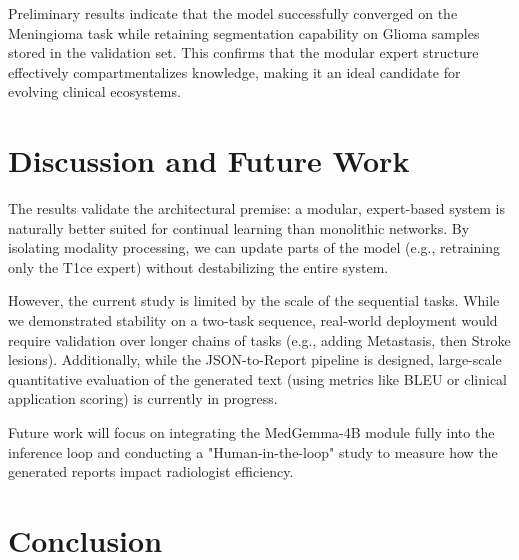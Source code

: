 \documentclass[conference]{IEEEtran}
\begin{document}
Preliminary results indicate that the model successfully converged on the Meningioma task while retaining segmentation capability on Glioma samples stored in the validation set. This confirms that the modular expert structure effectively compartmentalizes knowledge, making it an ideal candidate for evolving clinical ecosystems.


\section{Discussion and Future Work}

The results validate the architectural premise: a modular, expert-based system is naturally better suited for continual learning than monolithic networks. By isolating modality processing, we can update parts of the model (e.g., retraining only the T1ce expert) without destabilizing the entire system.

However, the current study is limited by the scale of the sequential tasks. While we demonstrated stability on a two-task sequence, real-world deployment would require validation over longer chains of tasks (e.g., adding Metastasis, then Stroke lesions). Additionally, while the JSON-to-Report pipeline is designed, large-scale quantitative evaluation of the generated text (using metrics like BLEU or clinical application scoring) is currently in progress.

Future work will focus on integrating the MedGemma-4B module fully into the inference loop and conducting a "Human-in-the-loop" study to measure how the generated reports impact radiologist efficiency.

\section{Conclusion}
\end{document}
